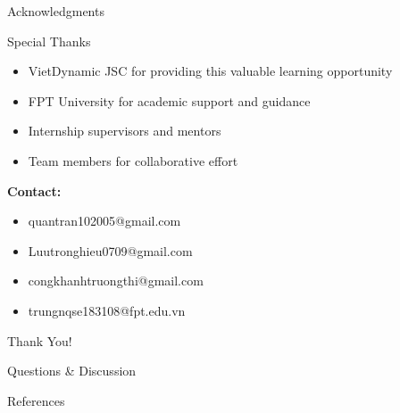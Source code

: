 \documentclass{beamer}
\begin{document}
\begin{frame}{Acknowledgments}
    \begin{block}{Special Thanks}
        \begin{itemize}
            \item \alert{VietDynamic JSC} for providing this valuable learning opportunity
            \item \alert{FPT University} for academic support and guidance
            \item Internship supervisors and mentors
            \item Team members for collaborative effort
        \end{itemize}
    \end{block}
    
    \textbf{Contact:} 
    \begin{itemize}
        \item quantran102005@gmail.com
        \item Luutronghieu0709@gmail.com  
        \item congkhanhtruongthi@gmail.com
        \item trungnqse183108@fpt.edu.vn
    \end{itemize}
    
\end{frame}
                                                         
\begin{frame}
    \centering
    \Huge Thank You!
    
    \vspace{1cm}
    \Large Questions \& Discussion
    
\end{frame}
                    
\appendix

\begin{frame}{References}
    \printbibliography[heading=none]
\end{frame}
                    
\end{document}
